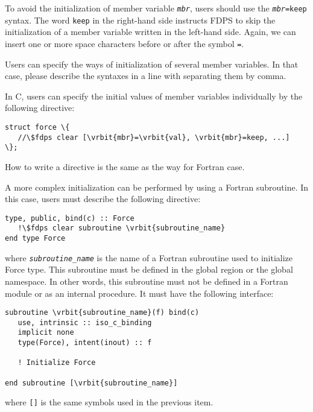 \begin{enumerate}[leftmargin=*,label=(\arabic*)]
To avoid the initialization of member variable \textit{\texttt{mbr}}, users should use the \texttt{\textit{mbr}=keep} syntax. The word \texttt{keep} in the right-hand side instructs FDPS to skip the initialization of a member variable written in the left-hand side. Again, we can insert one or more space characters before or after the symbol \texttt{=}.

Users can specify the ways of initialization of several member variables. In that case, please describe the syntaxes in a line with separating them by comma.

In C, users can specify the initial values of member variables individually by the following directive:
\begin{screen}
\begin{Verbatim}[commandchars=\\\{\}]
struct force \{
   //\$fdps clear [\vrbit{mbr}=\vrbit{val}, \vrbit{mbr}=keep, ...] 
\};
\end{Verbatim}
\end{screen}
How to write a directive is the same as the way for Fortran case.


A more complex initialization can be performed by using a Fortran subroutine. In this case, users must describe the following directive:
\begin{screen}
\begin{Verbatim}[commandchars=\\\{\}]
type, public, bind(c) :: Force
   !\$fdps clear subroutine \vrbit{subroutine_name}
end type Force
\end{Verbatim}
\end{screen}
where \textit{\texttt{subroutine\_name}} is the name of a Fortran subroutine used to initialize Force type. This subroutine must be defined in the global region or the global namespace. In other words, this subroutine must not be defined in a Fortran module or as an internal procedure. It must have the following interface:
\begin{screen}
\begin{Verbatim}[commandchars=\\\{\}]
subroutine \vrbit{subroutine_name}(f) bind(c)
   use, intrinsic :: iso_c_binding
   implicit none
   type(Force), intent(inout) :: f
   
   ! Initialize Force
   
end subroutine [\vrbit{subroutine_name}]
\end{Verbatim}
\end{screen}
where \texttt{[]} is the same symbols used in the previous item.


\end{enumerate}
